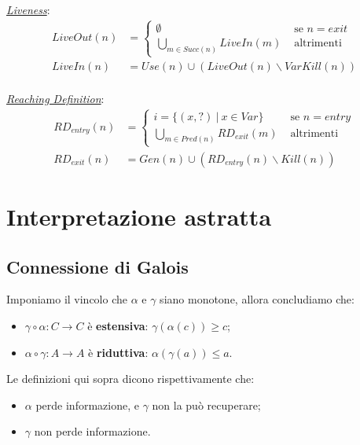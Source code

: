 \documentclass{article}
\begin{document}
                \textit{\underline{Liveness}}:
                \begin{align*}
                    LiveOut(n) &=
                    \begin{cases}
                        \emptyset &\text{ se $n= exit$} \\
                        \bigcup_{m\in Succ(n)} LiveIn(m) &\text{ altrimenti}
                    \end{cases}\\
                    LiveIn(n) &= Use(n) \cup (LiveOut(n)\backslash VarKill(n))
                \end{align*}
                \\

                \textit{\underline{Reaching Definition}}:
                \begin{align*}
                    RD_{entry}(n) &=
                    \begin{cases}
                        i=\{(x, ?) ~|~ x\in Var \} &\text{ se $n= entry$} \\
                        \bigcup_{m\in Pred(n)} RD_{exit}(m) &\text{ altrimenti}
                    \end{cases}\\
                    RD_{exit}(n) &= Gen(n) \cup (RD_{entry}(n)\backslash Kill(n))
                \end{align*}

    \newpage
    \section{Interpretazione astratta}
        \subsection{Connessione di Galois}
            Imponiamo il vincolo che $\alpha$ e $\gamma$ siano monotone, allora concludiamo che: \begin{itemize}
                \item $\gamma \circ \alpha: C \to C$ è \textbf{estensiva}: $\gamma(\alpha(c)) \geq c$;
                \item $\alpha \circ \gamma : A \to A$ è \textbf{riduttiva}: $\alpha(\gamma(a)) \leq a$.
            \end{itemize}

            Le definizioni qui sopra dicono rispettivamente che:
            \begin{itemize}
                \item $\alpha$ perde informazione, e $\gamma$ non la può recuperare;
                \item $\gamma$ non perde informazione.
            \end{itemize}
\end{document}
